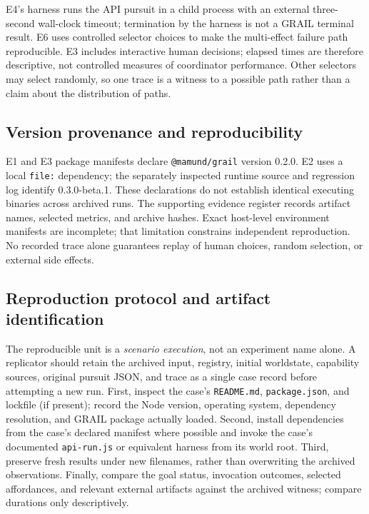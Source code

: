 \documentclass[11pt]{article}
\begin{document}
E4's harness runs the API pursuit in a child process with an external three-second wall-clock timeout; termination by the harness is not a GRAIL terminal result. E6 uses controlled selector choices to make the multi-effect failure path reproducible. E3 includes interactive human decisions; elapsed times are therefore descriptive, not controlled measures of coordinator performance. Other selectors may select randomly, so one trace is a witness to a possible path rather than a claim about the distribution of paths.

\subsection{Version provenance and reproducibility}
E1 and E3 package manifests declare \texttt{@mamund/grail} version 0.2.0. E2 uses a local \texttt{file:} dependency; the separately inspected runtime source and regression log identify 0.3.0-beta.1. These declarations do not establish identical executing binaries across archived runs. The supporting evidence register records artifact names, selected metrics, and archive hashes. Exact host-level environment manifests are incomplete; that limitation constrains independent reproduction. No recorded trace alone guarantees replay of human choices, random selection, or external side effects.


\subsection{Reproduction protocol and artifact identification}
The reproducible unit is a \emph{scenario execution}, not an experiment name alone. A replicator should retain the archived input, registry, initial worldstate, capability sources, original pursuit JSON, and trace as a single case record before attempting a new run. First, inspect the case's \texttt{README.md}, \texttt{package.json}, and lockfile (if present); record the Node version, operating system, dependency resolution, and GRAIL package actually loaded. Second, install dependencies from the case's declared manifest where possible and invoke the case's documented \texttt{api-run.js} or equivalent harness from its world root. Third, preserve fresh results under new filenames, rather than overwriting the archived observations. Finally, compare the goal status, invocation outcomes, selected affordances, and relevant external artifacts against the archived witness; compare durations only descriptively.
\end{document}
